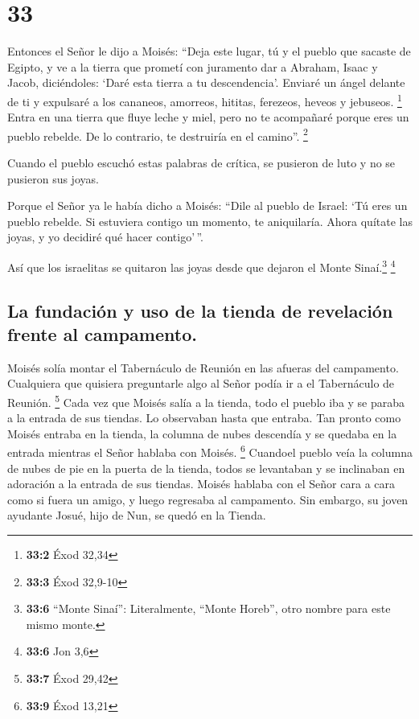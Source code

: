 \hypertarget{section-32}{%
\section{33}\label{section-32}}

 Entonces el Señor le dijo a Moisés: ``Deja este lugar, tú
y el pueblo que sacaste de Egipto, y ve a la tierra que prometí con
juramento dar a Abraham, Isaac y Jacob, diciéndoles: `Daré esta tierra a
tu descendencia'.  Enviaré un ángel delante de ti y
expulsaré a los cananeos, amorreos, hititas, ferezeos, heveos y
jebuseos. \footnote{\textbf{33:2} Éxod 32,34}  Entra en
una tierra que fluye leche y miel, pero no te acompañaré porque eres un
pueblo rebelde. De lo contrario, te destruiría en el camino''.
\footnote{\textbf{33:3} Éxod 32,9-10}

 Cuando el pueblo escuchó estas palabras de crítica, se
pusieron de luto y no se pusieron sus joyas.

 Porque el Señor ya le había dicho a Moisés: ``Dile al
pueblo de Israel: `Tú eres un pueblo rebelde. Si estuviera contigo un
momento, te aniquilaría. Ahora quítate las joyas, y yo decidiré qué
hacer contigo'\,''.

 Así que los israelitas se quitaron las joyas desde que
dejaron el Monte Sinaí.\footnote{\textbf{33:6} ``Monte Sinaí'':
  Literalmente, ``Monte Horeb'', otro nombre para este mismo monte.}
\footnote{\textbf{33:6} Jon 3,6}

\hypertarget{la-fundaciuxf3n-y-uso-de-la-tienda-de-revelaciuxf3n-frente-al-campamento.}{%
\subsection{La fundación y uso de la tienda de revelación frente al
campamento.}\label{la-fundaciuxf3n-y-uso-de-la-tienda-de-revelaciuxf3n-frente-al-campamento.}}

 Moisés solía montar el Tabernáculo de Reunión en las
afueras del campamento. Cualquiera que quisiera preguntarle algo al
Señor podía ir a el Tabernáculo de Reunión. \footnote{\textbf{33:7} Éxod
  29,42}  Cada vez que Moisés salía a la tienda, todo el
pueblo iba y se paraba a la entrada de sus tiendas. Lo observaban hasta
que entraba.  Tan pronto como Moisés entraba en la tienda,
la columna de nubes descendía y se quedaba en la entrada mientras el
Señor hablaba con Moisés. \footnote{\textbf{33:9} Éxod 13,21}
 Cuandoel pueblo veía la columna de nubes de pie en la
puerta de la tienda, todos se levantaban y se inclinaban en adoración a
la entrada de sus tiendas.  Moisés hablaba con el Señor
cara a cara como si fuera un amigo, y luego regresaba al campamento. Sin
embargo, su joven ayudante Josué, hijo de Nun, se quedó en la Tienda.

